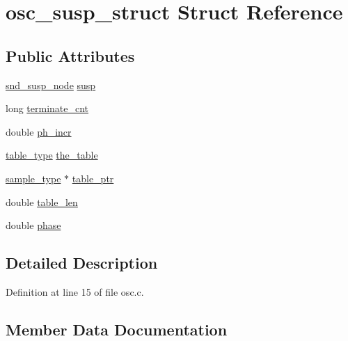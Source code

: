 \hypertarget{structosc__susp__struct}{}\section{osc\+\_\+susp\+\_\+struct Struct Reference}
\label{structosc__susp__struct}
\subsection*{Public Attributes}
\begin{DoxyCompactItemize}
\item 
\hyperlink{sound_8h_a6b268203688a934bd798ceb55f85d4c0}{snd\+\_\+susp\+\_\+node} \hyperlink{structosc__susp__struct_a1cc08ea2dff8ac9cfb259d15a7c7f485}{susp}
\item 
long \hyperlink{structosc__susp__struct_a98e8e78e0f225b39f83fee67180650b9}{terminate\+\_\+cnt}
\item 
double \hyperlink{structosc__susp__struct_a10e5fc85317199ce83579f2870e5ae6e}{ph\+\_\+incr}
\item 
\hyperlink{sound_8h_a187b856587310160cfd8b383e7377171}{table\+\_\+type} \hyperlink{structosc__susp__struct_a29ef206ee2958a28ddbef22ac8d82658}{the\+\_\+table}
\item 
\hyperlink{sound_8h_a3a9d1d4a1c153390d2401a6e9f71b32c}{sample\+\_\+type} $\ast$ \hyperlink{structosc__susp__struct_a7ef57da5933f674729a56fba0e9e6b26}{table\+\_\+ptr}
\item 
double \hyperlink{structosc__susp__struct_aea4b8fbb22977eb5c4a4f8482f0036ae}{table\+\_\+len}
\item 
double \hyperlink{structosc__susp__struct_abdaad2fcf19d332561e9ce071005ba5c}{phase}
\end{DoxyCompactItemize}


\subsection{Detailed Description}


Definition at line 15 of file osc.\+c.



\subsection{Member Data Documentation}
